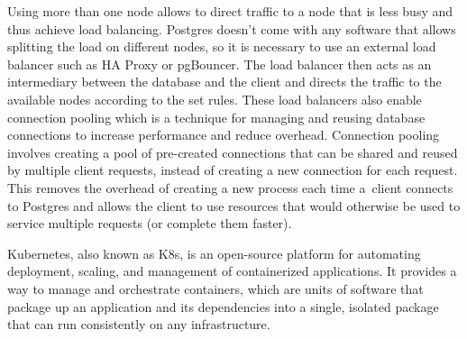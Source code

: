 Using more than one node allows to direct traffic to a node that is less busy and thus achieve load balancing. Postgres doesn't come with any software that allows splitting the load on different nodes, so it is necessary to use an external load balancer such as HA Proxy or pgBouncer. The load balancer then acts as an intermediary between the database and the client and directs the traffic to the available nodes according to the set rules. These load balancers also enable connection pooling which is a technique for managing and reusing database connections to increase performance and reduce overhead. Connection pooling involves creating a pool of pre-created connections that can be shared and reused by multiple client requests, instead of creating a new connection for each request. This removes the overhead of creating a new process each time a client connects to Postgres and allows the client to use resources that would otherwise be used to service multiple requests (or complete them faster). \cite{PerconaBlogConnectionPooling}

\label{chap:kubernetes}
Kubernetes, also known as K8s, is an open-source platform for automating deployment, scaling, and management of containerized applications. It provides a way to manage and orchestrate containers, which are units of software that package up an application and its dependencies into a single, isolated package that can run consistently on any infrastructure. \cite{vayghan2019Kubernetes}

